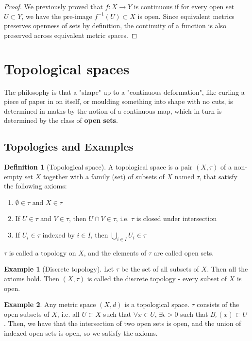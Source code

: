 \documentclass{article}
\theoremstyle{definition}
\newtheorem{defn}{Definition}[section]
\newtheorem{exmp}{Example}[section]
\theoremstyle{plain}%
\theoremstyle{remark}
\newcommand{\Union}{\bigcup}
\begin{document}
\begin{proof}
We previously proved that $f:X \to Y$ is continuous if for every open set $U \subset Y$, we have the pre-image $f^{-1}(U) \subset X$ is open. Since equivalent metrics preserves openness of sets by definition, the continuity of a function is also preserved across equivalent metric spaces.
\end{proof}

\section{Topological spaces}

The philosophy is that a "shape" up to a "continuous deformation", like curling a piece of paper in on itself, or moulding something into shape with no cuts, is determined in maths by the notion of a continuous map, which in turn is determined by the class of \textbf{open sets}.

\subsection{Topologies and Examples}

\begin{defn}[Topological space]
A topological space is a pair $(X, \tau)$ of a non-empty set $X$ together with a family (set) of subsets of $X$ named $\tau$, that satisfy the following axioms:
\begin{enumerate}
    \item $\emptyset \in \tau$ and $X \in \tau$
    \item If $U \in \tau$ and $V \in \tau$, then $U \cap V \in \tau$, i.e. $\tau$ is closed under intersection
    \item If $U_i \in \tau$ indexed by $i \in I$, then $\Union_{i \in I}U_i \in \tau$
\end{enumerate}

$\tau$ is called a topology on $X$, and the elements of $\tau$ are called open sets.
\end{defn}

\begin{exmp}[Discrete topology]
Let $\tau$ be the set of all subsets of $X$. Then all the axioms hold. Then $(X, \tau)$ is called the discrete topology - every subset of $X$ is open.
\end{exmp}

\begin{exmp}
Any metric space $(X,d)$ is a topological space. $\tau$ consists of the open subsets of $X$, i.e. all $U \subset X$ such that $\forall x \in U$, $\exists \epsilon > 0$ such that $B_{\epsilon}(x) \subset U$. Then, we have that the intersection of two open sets is open, and the union of indexed open sets is open, so we satisfy the axioms.
\end{exmp}
\end{document}
